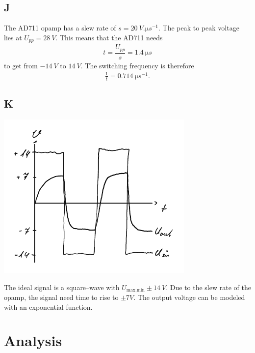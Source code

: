 \documentclass[a4paper,10pt]{article}
\newenvironment{Figure}
        {\par\medskip\noindent\minipage{\linewidth}}
        {\endminipage\par\medskip}
\numberwithin{equation}{section}
\begin{document}
\begin{multicols}{2}
	\subsection{J}
	The AD711 opamp has a slew rate of $s=\SI{20}{V.\micro s ^{-1}}$.
	The peak to peak voltage lies at $U_{p p}=\SI{28}{V}$.
	This means that the AD711 needs
	\begin{align}
		t=\dfrac{U_{p p}}{s}=\SI{1.4}{\micro s}
	\end{align}
	to get from $\SI{-14}{V}$ to $\SI{+14}{V}$.
	The switching frequency is therefore
	\begin{align}
		\tfrac{1}{t}=\SI{0.714}{\micro s ^{-1}}
		.\end{align}

	\subsection{K} \label{pre:K}
	\begin{Figure}
		\centering
		\includegraphics[width=\textwidth]{../plot/preK_crop.pdf}
	\end{Figure}
	\noindent The ideal signal is a square--wave with $U_\text{max,min}\pm \SI{14}{V}$.
	Due to the slew rate of the opamp, the signal need time to rise to $\pm \si{7}{V}$.
	The output voltage can be modeled with an exponential function.

	\newpage
	\section{Analysis}

\end{multicols}
\end{document}
